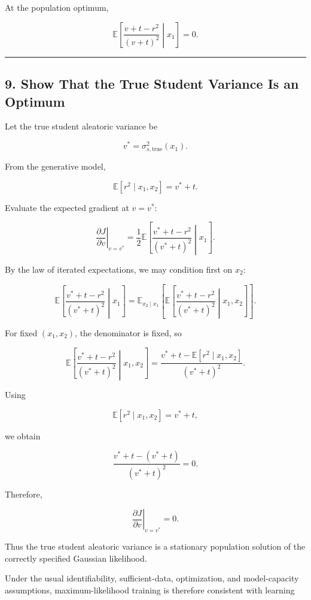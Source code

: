 At the population optimum,

\[
\mathbb{E}
\left[
\frac{v+t-r^2}{(v+t)^2}
\middle|x_1
\right]=0.
\]

\begin{center}\rule{0.5\linewidth}{0.5pt}\end{center}

\subsection{9. Show That the True Student Variance Is an
Optimum}\label{show-that-the-true-student-variance-is-an-optimum}

Let the true student aleatoric variance be

\[
v^*=\sigma_{s,\mathrm{true}}^2(x_1).
\]

From the generative model,

\[
\mathbb{E}[r^2\mid x_1,x_2]
=
v^*+t.
\]

Evaluate the expected gradient at \(v=v^*\):

\[
\left.\frac{\partial J}{\partial v}\right|_{v=v^*}
=
\frac12
\mathbb{E}
\left[
\frac{v^*+t-r^2}{(v^*+t)^2}
\middle|x_1
\right].
\]

By the law of iterated expectations, we may condition first on \(x_2\):

\[
\mathbb{E}
\left[
\frac{v^*+t-r^2}{(v^*+t)^2}
\middle|x_1
\right]
=
\mathbb{E}_{x_2\mid x_1}
\left[
\mathbb{E}
\left[
\frac{v^*+t-r^2}{(v^*+t)^2}
\middle|x_1,x_2
\right]
\right].
\]

For fixed \((x_1,x_2)\), the denominator is fixed, so

\[
\mathbb{E}
\left[
\frac{v^*+t-r^2}{(v^*+t)^2}
\middle|x_1,x_2
\right]
=
\frac{
v^*+t-\mathbb{E}[r^2\mid x_1,x_2]
}{(v^*+t)^2}.
\]

Using

\[
\mathbb{E}[r^2\mid x_1,x_2]=v^*+t,
\]

we obtain

\[
\frac{v^*+t-(v^*+t)}{(v^*+t)^2}=0.
\]

Therefore,

\[
\boxed{
\left.\frac{\partial J}{\partial v}\right|_{v=v^*}=0.
}
\]

Thus the true student aleatoric variance is a stationary population
solution of the correctly specified Gaussian likelihood.

Under the usual identifiability, sufficient-data, optimization, and
model-capacity assumptions, maximum-likelihood training is therefore
consistent with learning

